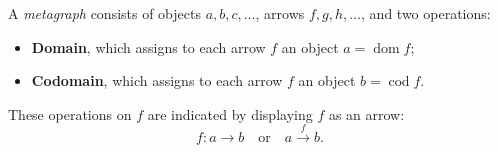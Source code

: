 A \emph{metagraph} consists of objects $a, b, c, \ldots$, arrows $f, g, h, \ldots$, and two operations:

\begin{itemize}
\item \textbf{Domain}, which assigns to each arrow $f$ an object $a = \operatorname{dom} f$;
\item \textbf{Codomain}, which assigns to each arrow $f$ an object $b = \operatorname{cod} f$.
\end{itemize}

These operations on $f$ are indicated by displaying $f$ as an arrow:
$$f: a \to b \quad \text{or} \quad a \xrightarrow{f} b.$$
